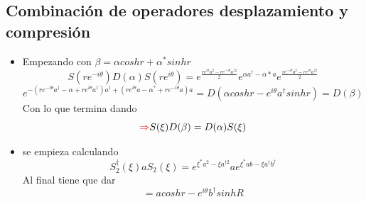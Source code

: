 \documentclass{book}
\begin{document}
    \subsection{Combinación de operadores desplazamiento y compresión}
       \begin{itemize} \item Empezando con ${\beta=\alpha cosh r+\alpha^* sinh r}$
       \begin{equation}{S(re^{-i\theta})D(\alpha)S(re^{i\theta})=e^{\frac{re^{i\theta}a^2-re^{-i\theta}a^{\dag 2}}{2}}e^{\alpha a^{\dag}-\alpha * a}e^{\frac{re^{-i\theta}a^2-re^{i\theta}a^{\dag 2}}{2}} }\end{equation} \begin{equation}{ e^{-(re^{-i\theta}a^\dag-\alpha+re^{i\theta}a^\dag)a^\dag+(re^{i\theta}a-\alpha^*+re^{-i\theta}a)a}=D(\alpha cosh r-e^{i\theta}a^\dag sinh r)=D(\beta)} \end{equation}
       Con lo que termina dando
       \begin{equation}{ \textcolor{red}{\Rightarrow} S(\xi)D(\beta)=D(\alpha)S(\xi)} \end{equation}
       \item se empieza calculando
       \begin{equation}{ S_2^\dag(\xi)aS_2(\xi)=e^{\xi^*a^2-\xi a^{\dag 2}}ae^{\xi^*ab-\xi a^\dag b^\dag}} \end{equation}
       \begin{equation}{} \end{equation}
       Al final tiene que dar \begin{equation}{=acosh r - e^{i\theta}b^\dag sinh R} \end{equation}
       \end{itemize}
\end{document}
